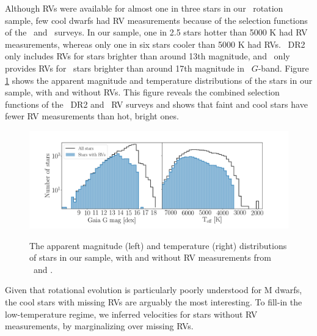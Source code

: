 Although RVs were available for almost one in three stars in our \kepler\
rotation sample, few cool dwarfs had RV measurements because of the selection
functions of the \gaia\ and \lamost\ surveys.
In our sample, one in 2.5 stars hotter than 5000 K had RV measurements,
whereas only one in six stars cooler than 5000 K had RVs.
\gaia\ DR2 only includes RVs for stars brighter than around 13th magnitude,
and \lamost\ only provides RVs for \kepler\ stars brighter than around 17th
magnitude in \gaia\ $G$-band.
Figure \ref{fig:rv_histogram} shows the apparent magnitude and temperature
distributions of the stars in our sample, with and without RVs.
This figure reveals the combined selection functions of the \gaia\ DR2 and
\lamost\ RV surveys and shows that faint and cool stars have fewer RV
measurements than hot, bright ones.
\begin{figure}[ht!]
\caption{
    The apparent magnitude (left) and temperature (right) distributions of
    stars in our sample, with and without RV measurements from \gaia\ and
    \lamost.
}
  \centering \includegraphics[width=1\textwidth]{rv_histogram}
\label{fig:rv_histogram}
\end{figure}
Given that rotational evolution is particularly poorly understood for M
dwarfs, the cool stars with missing RVs are arguably the most interesting.
To fill-in the low-temperature regime, we inferred velocities for stars
without RV measurements, by marginalizing over missing RVs.

